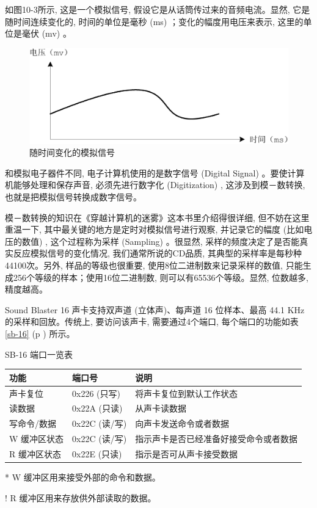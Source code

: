\documentclass[12pt]{article}
\begin{document}
\begin{CJK}{UTF8}{gbsn}
如图10-3所示, 这是一个模拟信号, 假设它是从话筒传过来的音频电流。显然, 它是随时间连续变化的, 时间的单位是毫秒 (ms) ；变化的幅度用电压来表示, 这里的单位是毫伏 (mv) 。
 
\begin{figure}
\begin{center}
\includegraphics[width=\textwidth]{eps/10-3.bmp.eps}
\end{center}
\caption{随时间变化的模拟信号}
\end{figure}

和模拟电子器件不同, 电子计算机使用的是数字信号 (Digital Signal) 。要使计算机能够处理和保存声音, 必须先进行数字化 (Digitization) , 这涉及到模－数转换, 也就是把模拟信号转换成数字信号。

模－数转换的知识在《穿越计算机的迷雾》这本书里介绍得很详细, 但不妨在这里重温一下, 其中最关键的地方是定时对模拟信号进行观察, 并记录它的幅度 (比如电压的数值) , 这个过程称为采样 (Sampling) 。很显然, 采样的频度决定了是否能真实反应模拟信号的变化情况, 我们通常所说的CD品质, 其典型的采样率是每秒种44100次。另外, 样品的等级也很重要, 使用8位二进制数来记录采样的数值, 只能生成256个等级的样本；使用16位二进制数, 则可以有65536个等级。显然, 位数越多, 精度越高。

Sound Blaster 16 声卡支持双声道 (立体声)、每声道 16 位样本、最高 44.1
KHz的采样和回放。传统上, 要访问该声卡, 需要通过4个端口, 每个端口的功能如表 \ref{sb-16} (p \pageref{sb-16})
所示。

\begin{threeparttable}
\caption{SB-16 端口一览表}\label{sb-16}
\begin{tabular}{p{2.7cm}p{1.5cm}p{2.5cm}}
\hline
功能 & 端口号 & 说明 \\
\hline
声卡复位 &	0x226 (只写) & 	将声卡复位到默认工作状态 \\
\hline
读数据	& 0x22A (只读)& 	从声卡读数据 \\
\hline
写命令/数据	& 0x22C (读/写) &	向声卡发送命令或者数据 \\
\hline
W 缓冲区状态\tnote{*} & 0x22C (读/写) &	指示声卡是否已经准备好接受命令或者数据 \\
\hline
R 缓冲区状态\tnote{!}& 0x22E (只读) 	& 指示是否可从声卡接受数据 \\
\hline
\end{tabular}
\begin{tablenotes}\small
\item[*]W 缓冲区用来接受外部的命令和数据。
\item[!]R 缓冲区用来存放供外部读取的数据。
\end{tablenotes}
\end{threeparttable}


\end{CJK}
\end{document}
